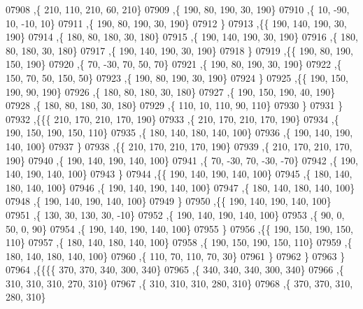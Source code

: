 \begin{DoxyCode}
07908     ,\{   210,   110,   210,    60,   210\}
07909     ,\{   190,    80,   190,    30,   190\}
07910     ,\{    10,   -90,    10,   -10,    10\}
07911     ,\{   190,    80,   190,    30,   190\}
07912     \}
07913    ,\{\{   190,   140,   190,    30,   190\}
07914     ,\{   180,    80,   180,    30,   180\}
07915     ,\{   190,   140,   190,    30,   190\}
07916     ,\{   180,    80,   180,    30,   180\}
07917     ,\{   190,   140,   190,    30,   190\}
07918     \}
07919    ,\{\{   190,    80,   190,   150,   190\}
07920     ,\{    70,   -30,    70,    50,    70\}
07921     ,\{   190,    80,   190,    30,   190\}
07922     ,\{   150,    70,    50,   150,    50\}
07923     ,\{   190,    80,   190,    30,   190\}
07924     \}
07925    ,\{\{   190,   150,   190,    90,   190\}
07926     ,\{   180,    80,   180,    30,   180\}
07927     ,\{   190,   150,   190,    40,   190\}
07928     ,\{   180,    80,   180,    30,   180\}
07929     ,\{   110,    10,   110,    90,   110\}
07930     \}
07931    \}
07932   ,\{\{\{   210,   170,   210,   170,   190\}
07933     ,\{   210,   170,   210,   170,   190\}
07934     ,\{   190,   150,   190,   150,   110\}
07935     ,\{   180,   140,   180,   140,   100\}
07936     ,\{   190,   140,   190,   140,   100\}
07937     \}
07938    ,\{\{   210,   170,   210,   170,   190\}
07939     ,\{   210,   170,   210,   170,   190\}
07940     ,\{   190,   140,   190,   140,   100\}
07941     ,\{    70,   -30,    70,   -30,   -70\}
07942     ,\{   190,   140,   190,   140,   100\}
07943     \}
07944    ,\{\{   190,   140,   190,   140,   100\}
07945     ,\{   180,   140,   180,   140,   100\}
07946     ,\{   190,   140,   190,   140,   100\}
07947     ,\{   180,   140,   180,   140,   100\}
07948     ,\{   190,   140,   190,   140,   100\}
07949     \}
07950    ,\{\{   190,   140,   190,   140,   100\}
07951     ,\{   130,    30,   130,    30,   -10\}
07952     ,\{   190,   140,   190,   140,   100\}
07953     ,\{    90,     0,    50,     0,    90\}
07954     ,\{   190,   140,   190,   140,   100\}
07955     \}
07956    ,\{\{   190,   150,   190,   150,   110\}
07957     ,\{   180,   140,   180,   140,   100\}
07958     ,\{   190,   150,   190,   150,   110\}
07959     ,\{   180,   140,   180,   140,   100\}
07960     ,\{   110,    70,   110,    70,    30\}
07961     \}
07962    \}
07963   \}
07964  ,\{\{\{\{   370,   370,   340,   300,   340\}
07965     ,\{   340,   340,   340,   300,   340\}
07966     ,\{   310,   310,   310,   270,   310\}
07967     ,\{   310,   310,   310,   280,   310\}
07968     ,\{   370,   370,   310,   280,   310\}

\end{DoxyCode}
